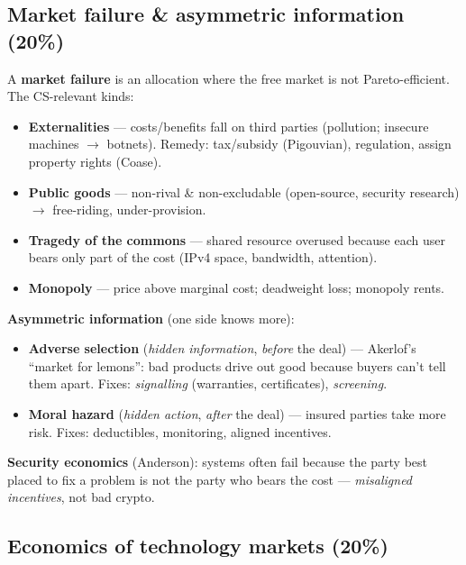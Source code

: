 \documentclass[11pt,a4paper]{article}
\begin{document}
\subsection{Market failure \& asymmetric information (20\%)}

\begin{must}
A \textbf{market failure} is an allocation where the free market is not Pareto-efficient. The CS-relevant kinds:
\begin{itemize}[leftmargin=*,itemsep=1pt]
  \item \textbf{Externalities} --- costs/benefits fall on third parties (pollution; insecure machines $\to$ botnets). Remedy: tax/subsidy (Pigouvian), regulation, assign property rights (Coase).
  \item \textbf{Public goods} --- non-rival \& non-excludable (open-source, security research) $\to$ free-riding, under-provision.
  \item \textbf{Tragedy of the commons} --- shared resource overused because each user bears only part of the cost (IPv4 space, bandwidth, attention).
  \item \textbf{Monopoly} --- price above marginal cost; deadweight loss; monopoly rents.
\end{itemize}
\end{must}

\begin{useful}
\textbf{Asymmetric information} (one side knows more):
\begin{itemize}[leftmargin=*,itemsep=1pt]
  \item \textbf{Adverse selection} (\emph{hidden information}, \emph{before} the deal) --- Akerlof's ``market for lemons'': bad products drive out good because buyers can't tell them apart. Fixes: \emph{signalling} (warranties, certificates), \emph{screening}.
  \item \textbf{Moral hazard} (\emph{hidden action}, \emph{after} the deal) --- insured parties take more risk. Fixes: deductibles, monitoring, aligned incentives.
\end{itemize}
\textbf{Security economics} (Anderson): systems often fail because the party best placed to fix a problem is not the party who bears the cost --- \emph{misaligned incentives}, not bad crypto.
\end{useful}

\subsection{Economics of technology markets (20\%)}
\end{document}
